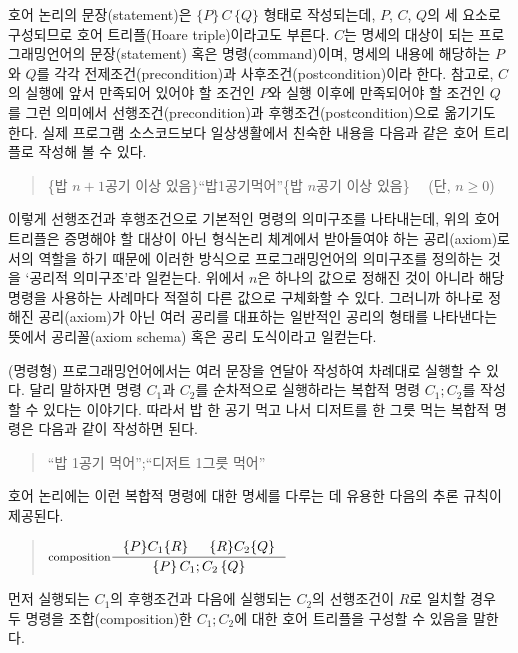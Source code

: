 호어 논리의 문장(statement)은 $\{P\}\,C\,\{Q\}$ 형태로 작성되는데,
$P$, $C$, $Q$의 세 요소로 구성되므로 호어 트리플(Hoare triple)이라고도
부른다. $C$는 명세의 대상이 되는 프로그래밍언어의 문장(statement) 혹은
명령(command)이며, 명세의 내용에 해당하는 ${P}$와 ${Q}$를 각각
전제조건(precondition)과 사후조건(postcondition)이라 한다.
참고로, $C$의 실행에 앞서 만족되어 있어야 할 조건인 $P$와
실행 이후에 만족되어야 할 조건인 $Q$를 그런 의미에서
선행조건(precondition)과 후행조건(postcondition)으로 옮기기도 한다.
실제 프로그램 소스코드보다 일상생활에서 친숙한 내용을 다음과 같은
호어 트리플로 작성해 볼 수 있다.
\begin{quote}\small
\{밥 $n+1$공기 이상 있음\}\;``밥\;1공기\;먹어''\;\{밥 $n$공기 이상 있음\}
~~(단, $n\ge 0$)
\end{quote}
이렇게 선행조건과 후행조건으로 기본적인 명령의 의미구조를 나타내는데,
위의 호어 트리플은 증명해야 할 대상이 아닌 형식논리 체계에서
받아들여야 하는 공리(axiom)로서의 역할을 하기 때문에 이러한 방식으로
프로그래밍언어의 의미구조를 정의하는 것을 `공리적 의미구조'라
일컫는다. 위에서 $n$은 하나의 값으로 정해진 것이 아니라 해당 명령을
사용하는 사례마다 적절히 다른 값으로 구체화할 수 있다. 그러니까 하나로
정해진 공리(axiom)가 아닌 여러 공리를 대표하는 일반적인 공리의 형태를
나타낸다는 뜻에서 공리꼴(axiom schema) 혹은 공리 도식이라고 일컫는다.

(명령형) 프로그래밍언어에서는 여러 문장을 연달아 작성하여 차례대로
실행할 수 있다. 달리 말하자면 명령 $C_1$과 $C_2$를 순차적으로 실행하라는
복합적 명령 $C_1;C_2$를 작성할 수 있다는 이야기다. 따라서 밥 한 공기
먹고 나서 디저트를 한 그릇 먹는 복합적 명령은 다음과 같이 작성하면 된다.
\begin{quote}\small
``밥 1공기 먹어'';``디저트 1그릇 먹어''
\end{quote}
호어 논리에는 이런 복합적 명령에 대한 명세를 다루는 데 유용한
다음의 추론 규칙이 제공된다.
\begin{quote}
\( \inference[composition]{ \{P\}C_1\{R\} & \{R\}C_2\{Q\} }{
                            \{P\}\,C_1;C_2\,\{Q\} } \)
\end{quote}
먼저 실행되는 $C_1$의 후행조건과 다음에 실행되는 $C_2$의 선행조건이
$R$로 일치할 경우 두 명령을 조합(composition)한 $C_1;C_2$에 대한
호어 트리플을 구성할 수 있음을 말한다.

